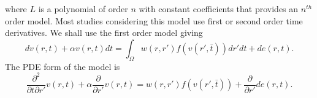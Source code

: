 \documentclass[onecolumn,draftcls]{IEEEtran}
\begin{document}
where $L$ is a polynomial of order $n$ with constant coefficients that provides an $n^{th}$ order model. Most studies considering this model use first or second order time derivatives. We shall use the first order model giving
\begin{equation}\label{FinalForm1}
dv\left( {r,t} \right) + \alpha v\left( r,t \right)dt = \int_\Omega  {w\left( r,r' \right)f\left( {v\left( r',\bar t \right)} \right)dr'dt}  +de\left( r,t \right).
\end{equation}
The PDE form of the model is
\begin{equation}\label{PDE}
\frac{\partial^2}{\partial t \partial r'} v\left( r,t \right) + \alpha \frac{\partial}{\partial r'} v\left( r,t \right) = w\left( r,r' \right)f\left( v\left( r',\bar t \right) \right)  + \frac{\partial}{\partial r'}de\left( {r,t} \right).
\end{equation}
% 
\end{document}
